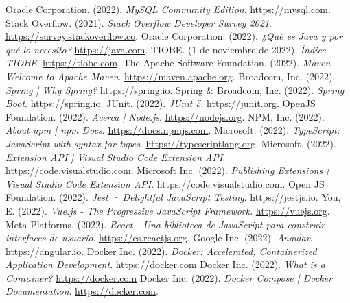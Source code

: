 \begin{thebibliography}{99}
     Oracle Corporation. (2022). \textit{MySQL Community Edition}. \href{https://www.mysql.com/products/community/}{https://mysql.com}.
     Stack Overflow. (2021). \textit{Stack Overflow Developer Survey 2021}. \href{https://survey.stackoverflow.co/2021}{https://survey.stackoverflow.co}.
     Oracle Corporation. (2022). \textit{¿Qué es Java y por qué lo necesito?} \href{https://www.java.com/es/download/help/whatis_java.html}{https://java.com}.
     TIOBE. (1 de noviembre de 2022). \textit{Índice TIOBE}. \href{https://www.tiobe.com/tiobe-index/}{https://tiobe.com}.
     The Apache Software Foundation. (2022). \textit{Maven - Welcome to Apache Maven}. \href{https://maven.apache.org}{https://maven.apache.org}.
     Broadcom, Inc. (2022). \textit{Spring | Why Spring?} \href{https://spring.io/why-spring}{https://spring.io}.
     Spring \& Broadcom, Inc. (2022). \textit{Spring Boot}. \href{https://spring.io/projects/spring-boot}{https://spring.io}.
     JUnit. (2022). \textit{JUnit 5}. \href{https://junit.org/junit5/}{https://junit.org}.
     OpenJS Foundation. (2022). \textit{Acerca | Node.js}. \href{https://nodejs.org/es/about/}{https://nodejs.org}.
     NPM, Inc. (2022). \textit{About npm | npm Docs}. \href{https://docs.npmjs.com/about-npm}{https://docs.npmjs.com}.
     Microsoft. (2022). \textit{TypeScript: JavaScript with syntax for types}. \href{https://www.typescriptlang.org}{https://typescriptlang.org}.
     Microsoft. (2022). \textit{Extension API | Visual Studio Code Extension API}. \href{https://code.visualstudio.com/api}{https://code.visualstudio.com}.
     Microsoft Inc. (2022). \textit{Publishing Extensions | Visual Studio Code Extension API}. \href{https://code.visualstudio.com/api/working-with-extensions/publishing-extension}{https://code.visualstudio.com}.
     Open JS Foundation. (2022). \textit{Jest · Delightful JavaScript Testing}. \href{https://jestjs.io/}{https://jestjs.io}.
     You, E. (2022). \textit{Vue.js - The Progressive JavaScript Framework}. \href{https://vuejs.org}{https://vuejs.org}.
     Meta Platforms. (2022). \textit{React - Una biblioteca de JavaScript para construir interfaces de usuario}. \href{https://es.reactjs.org}{https://es.reactjs.org}.
     Google Inc. (2022). \textit{Angular}. \href{https://angular.io}{https://angular.io}.
     Docker Inc. (2022). \textit{Docker: Accelerated, Containerized Application Development}. \href{https://www.docker.com}{https://docker.com}
     Docker Inc. (2022). \textit{What is a Container?} \href{https://www.docker.com/resources/what-container/}{https://docker.com}
     Docker Inc. (2022). \textit{Docker Compose | Docker Documentation}. \href{https://docs.docker.com/compose/}{https://docker.com}.


\end{thebibliography}
